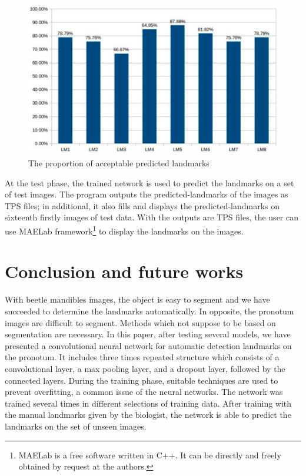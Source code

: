 \documentclass[conference]{IEEEtran}
\begin{document}
\begin{figure}[htbp]
	\centerline{\includegraphics[scale=0.2]{images/chart.eps}}
	\caption{The proportion of acceptable predicted landmarks}
	\label{figchart}
\end{figure}

At the test phase, the trained network is used to predict the landmarks on a set of test images. The program outputs the predicted-landmarks of the images as TPS files; in additional, it also fills and displays the predicted-landmarks on sixteenth firstly images of test data. With the outputs are TPS files, the user can use MAELab \cite{le2017maelab} framework\footnote{MAELab is a free software written in C++. It can be directly
and freely obtained by request at the authors.} to display the landmarks on the images.
\section{Conclusion and future works}
With beetle mandibles images, the object is easy to segment and we have succeeded to determine the landmarks automatically. In opposite, the pronotum images are difficult to segment. Methods which not suppose to be based on segmentation are necessary. In this paper, after testing several models, we have presented a convolutional neural network for automatic detection landmarks on the pronotum. It includes three times repeated structure which consists of a convolutional layer, a max pooling layer, and a dropout layer, followed by the connected layers. During the training phase, suitable techniques are used to prevent overfitting, a common issue of the neural networks. The network was trained several times in different selections of training data. After training with the manual landmarks given by the biologist, the network is able to predict the landmarks on the set of unseen images.
\end{document}
